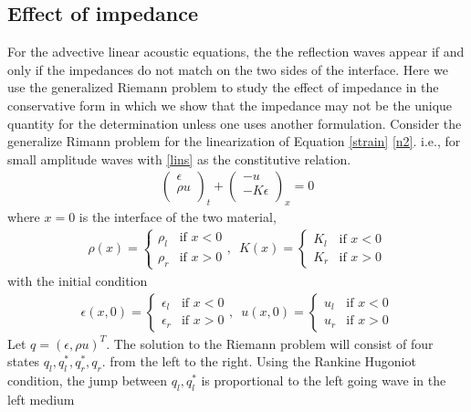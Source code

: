 \documentclass{article}
\begin{document}
\subsection{Effect of impedance}
For the advective linear acoustic equations, the the reflection waves appear if and only if the impedances do not match on the two sides of the interface. Here we use the generalized Riemann problem to study the effect of impedance in the conservative form in which we show that the impedance may not be the unique quantity for the determination unless one uses another formulation. Consider the generalize Rimann problem for the linearization of Equation \eqref{strain} \eqref{n2}. i.e., for small amplitude waves with \eqref{lins} as the constitutive relation.
\begin{align}
\left(
  \begin{array}{c}
    \epsilon \\
    \rho u \\
  \end{array}
\right)_t+
\left(
             \begin{array}{c}
                      -u \\
                      -K\epsilon \\
                    \end{array}
             \right)_x=0
\end{align}
where $x=0$ is the interface of the two material,
\begin{align}
	\rho(x)=\begin{cases}\rho_l & \text{if } x<0 \\
	\rho_r & \text{if } x>0\end{cases}, \,\,\,
	K(x)=\begin{cases}K_l & \text{if } x<0 \\
	K_r & \text{if } x>0\end{cases}
\end{align}
with the initial condition
\begin{align}
	\epsilon(x,0)=\begin{cases}\epsilon_l & \text{if } x<0 \\
	\epsilon_r & \text{if } x>0\end{cases}, \,\,\,
	u(x,0)=\begin{cases}u_l & \text{if } x<0 \\
	u_r & \text{if } x>0\end{cases}
\end{align}
Let $q=(\epsilon,\rho u)^T$. The solution to the Riemann problem will consist of four states $q_l,q_l^*,q_r^*,q_r$. from the left to the right. Using the Rankine Hugoniot condition, the jump between $q_l,q_l^*$ is proportional to the left going wave in the left medium
\end{document}
